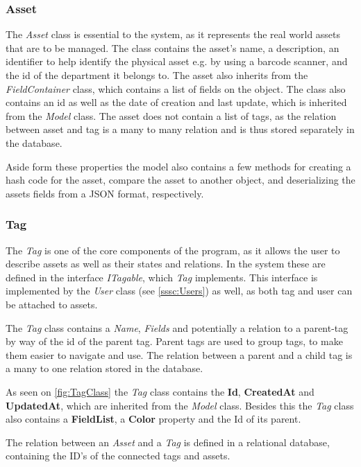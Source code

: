 \subsubsection{Asset}\label{sssc:asset}
The \textit{Asset} class is essential to the system, as it represents the real world assets that are to be managed. The class contains the asset's name, a description, an identifier to help identify the physical asset e.g. by using a barcode scanner, and the id of the department it belongs to. The asset also inherits from the \textit{FieldContainer} class, which contains a list of fields on the object. The class also contains an id as well as the date of creation and last update, which is inherited from the \textit{Model} class. The asset does not contain a list of tags, as the relation between asset and tag is a many to many relation and is thus stored separately in the database. 
\par
Aside form these properties the model also contains a few methods for creating a hash code for the asset, compare the asset to another object, and deserializing the assets fields from a JSON format, respectively. 


\subsubsection{Tag}\label{sssc:tag}
The \textit{Tag} is one of the core components of the program, as it allows the user to describe assets as well as their states and relations. In the system these are defined in the interface \textit{ITagable}, which \textit{Tag} implements. This interface is implemented by the \textit{User} class (see \autoref{sssc:Users}) as well, as both tag and user can be attached to assets. 
\par

The \textit{Tag} class contains a \textit{Name}, \textit{Fields} and potentially a relation to a parent-tag by way of the id of the parent tag. Parent tags are used to group tags, to make them easier to navigate and use. The relation between a parent and a child tag is a many to one relation stored in the database.
\par
As seen on \autoref{fig:TagClass} the \textit{Tag} class contains the \textbf{Id}, \textbf{CreatedAt} and \textbf{UpdatedAt}, which are inherited from the \textit{Model} class. Besides this the \textit{Tag} class also contains a \textbf{FieldList}, a \textbf{Color} property and the Id of its parent. 
\par {}
The relation between an \textit{Asset} and a \textit{Tag} is defined in a relational database, containing the ID's of the connected tags and assets.

